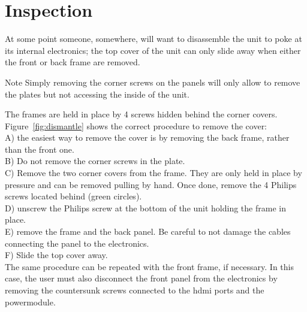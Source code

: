 \section{Inspection}\label{ch:inspection}
At some point someone, somewhere, will want to disassemble the unit to poke at its internal electronics; the top cover of the unit can only slide away when either the front or back frame are removed.
\begin{alertinfo}{Note}
    Simply removing the corner screws on the panels will only allow to remove the plates but not accessing the inside of the unit.
\end{alertinfo}
The frames are held in place by 4 screws hidden behind the corner covers.\\Figure~\ref{fig:dismantle} shows the correct procedure to remove the cover:\\
A) the easiest way to remove the cover is by removing the back frame, rather than the front one.\\
B) Do not remove the corner screws in the plate.\\
C) Remove the two corner covers from the frame. They are only held in place by pressure and can be removed pulling by hand. Once done, remove the 4 Philips screws located behind (green circles).\\
D) unscrew the Philips screw at the bottom of the unit holding the frame in place.\\
E) remove the frame and the back panel. Be careful to not damage the cables connecting the panel to the electronics.\\
F) Slide the top cover away.\\
The same procedure can be repeated with the front frame, if necessary. In this case, the user must also disconnect the front panel from the electronics by removing the countersunk screws connected to the \gls{hdmi} ports and the powermodule.
